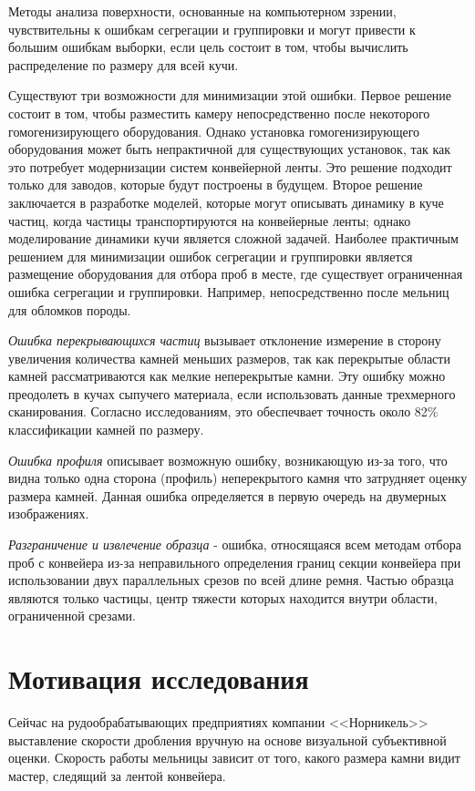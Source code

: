 \documentclass[times]{itmo-student-thesis}
\begin{document}
Методы анализа поверхности, основанные на компьютерном ззрении, чувствительны к ошибкам сегрегации и группировки и могут привести к большим ошибкам выборки, если цель состоит в том, чтобы вычислить распределение по размеру для всей кучи. 

Существуют три возможности для минимизации этой ошибки. Первое решение состоит в том, чтобы разместить камеру непосредственно после некоторого гомогенизирующего оборудования. Однако установка гомогенизирующего оборудования может быть непрактичной для существующих установок, так как это потребует модернизации систем конвейерной ленты. Это решение подходит только для заводов, которые будут построены в будущем. Второе решение заключается в разработке моделей, которые могут описывать динамику в куче частиц, когда частицы транспортируются на конвейерные ленты; однако моделирование динамики кучи является сложной задачей. Наиболее практичным решением для минимизации ошибок сегрегации и группировки является размещение оборудования для отбора проб в месте, где существует ограниченная ошибка сегрегации и группировки. Например, непосредственно после мельниц для обломков породы.

\textit{Ошибка перекрывающихся частиц} вызывает отклонение измерение в сторону увеличения количества камней меньших размеров, так как перекрытые области камней рассматриваются как мелкие неперекрытые камни. Эту ошибку можно преодолеть в кучах сыпучего материала, если использовать данные трехмерного сканирования. Согласно исследованиям, это обеспечвает  точность около 82\% классификации камней по размеру.

\textit{Ошибка профиля} описывает возможную ошибку, возникающую из-за того,  что видна только одна сторона (профиль) неперекрытого камня что затрудняет оценку размера камней. Данная ошибка определяется в первую очередь на двумерных изображениях.

\textit{Разграничение и извлечение образца} - ошибка, относящаяся всем методам отбора проб с конвейера из-за неправильного определения границ секции конвейера при использовании двух параллельных срезов по всей длине ремня. Частью образца являются только частицы, центр тяжести которых находится внутри области, ограниченной срезами.

\section{Мотивация исследования}
Сейчас на рудообрабатывающих предприятиях компании <<Норникель>> выставление скорости дробления вручную на основе визуальной субъективной оценки. Скорость работы мельницы зависит от того, какого размера камни видит мастер, следящий за лентой конвейера. 
\end{document}
